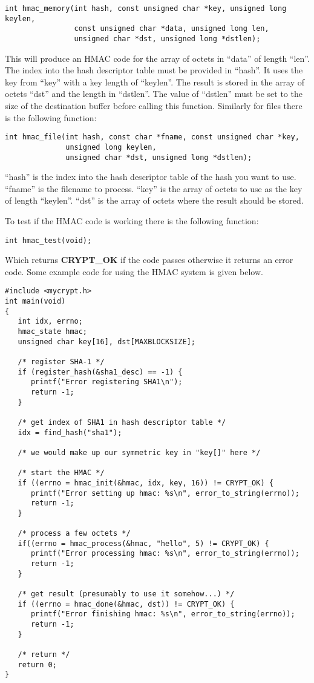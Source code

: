 \documentclass{book}
\begin{document}
\begin{verbatim}
int hmac_memory(int hash, const unsigned char *key, unsigned long keylen,
                const unsigned char *data, unsigned long len, 
                unsigned char *dst, unsigned long *dstlen);
\end{verbatim}
This will produce an HMAC code for the array of octets in ``data'' of length ``len''.  The index into the hash descriptor 
table must be provided in ``hash''.  It uses the key from ``key'' with a key length of ``keylen''.  
The result is stored in the array of octets ``dst'' and the length in ``dstlen''.  The value of ``dstlen'' must be set
to the size of the destination buffer before calling this function.  Similarly for files there is the  following function:
\begin{verbatim}
int hmac_file(int hash, const char *fname, const unsigned char *key,
              unsigned long keylen, 
              unsigned char *dst, unsigned long *dstlen);
\end{verbatim}
``hash'' is the index into the hash descriptor table of the hash you want to use.  ``fname'' is the filename to process.  
``key'' is the array of octets to use as the key of length ``keylen''.  ``dst'' is the array of octets where the 
result should be stored.

To test if the HMAC code is working there is the following function:
\begin{verbatim}
int hmac_test(void);
\end{verbatim}
Which returns {\bf CRYPT\_OK} if the code passes otherwise it returns an error code.  Some example code for using the 
HMAC system is given below.

\begin{small}
\begin{verbatim}
#include <mycrypt.h>
int main(void)
{
   int idx, errno;
   hmac_state hmac;
   unsigned char key[16], dst[MAXBLOCKSIZE];

   /* register SHA-1 */
   if (register_hash(&sha1_desc) == -1) {
      printf("Error registering SHA1\n");
      return -1;
   }

   /* get index of SHA1 in hash descriptor table */
   idx = find_hash("sha1");

   /* we would make up our symmetric key in "key[]" here */

   /* start the HMAC */
   if ((errno = hmac_init(&hmac, idx, key, 16)) != CRYPT_OK) {
      printf("Error setting up hmac: %s\n", error_to_string(errno));
      return -1;
   }

   /* process a few octets */
   if((errno = hmac_process(&hmac, "hello", 5) != CRYPT_OK) {
      printf("Error processing hmac: %s\n", error_to_string(errno));
      return -1;
   }

   /* get result (presumably to use it somehow...) */
   if ((errno = hmac_done(&hmac, dst)) != CRYPT_OK) {
      printf("Error finishing hmac: %s\n", error_to_string(errno));
      return -1;
   }
  
   /* return */
   return 0;
}
\end{verbatim}
\end{small}
\end{document}
